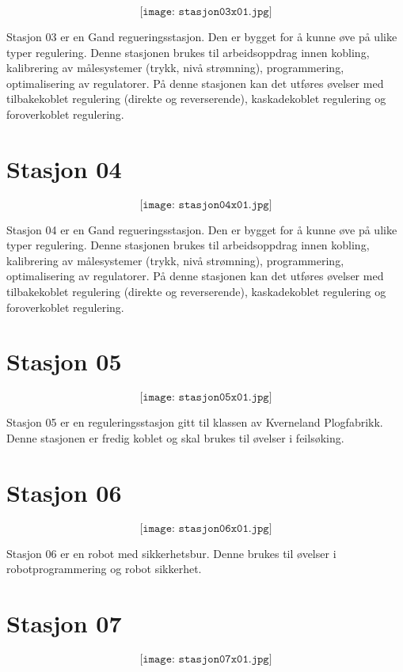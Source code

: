 $$\texttt{[image: stasjon03x01.jpg]}$$

Stasjon 03 er en Gand regueringsstasjon. Den er bygget for å kunne øve på ulike typer regulering. Denne stasjonen brukes til arbeidsoppdrag innen kobling, kalibrering av målesystemer (trykk, nivå strømning), programmering, optimalisering av regulatorer.  På denne stasjonen kan det utføres øvelser med tilbakekoblet regulering (direkte og reverserende), kaskadekoblet regulering og foroverkoblet regulering. 

\section{Stasjon 04}

$$\texttt{[image: stasjon04x01.jpg]}$$

Stasjon 04 er en Gand regueringsstasjon. Den er bygget for å kunne øve på ulike typer regulering. Denne stasjonen brukes til arbeidsoppdrag innen kobling, kalibrering av målesystemer (trykk, nivå strømning), programmering, optimalisering av regulatorer.  På denne stasjonen kan det utføres øvelser med tilbakekoblet regulering (direkte og reverserende), kaskadekoblet regulering og foroverkoblet regulering. 

\section{Stasjon 05}

$$\texttt{[image: stasjon05x01.jpg]}$$

Stasjon 05 er en reguleringsstasjon gitt til klassen av Kverneland Plogfabrikk. Denne stasjonen er fredig koblet og skal brukes til øvelser i feilsøking. 

\section{Stasjon 06}

$$\texttt{[image: stasjon06x01.jpg]}$$

Stasjon 06 er en robot med sikkerhetsbur. Denne brukes til øvelser i robotprogrammering og robot sikkerhet. 
\section{Stasjon 07}

$$\texttt{[image: stasjon07x01.jpg]}$$

